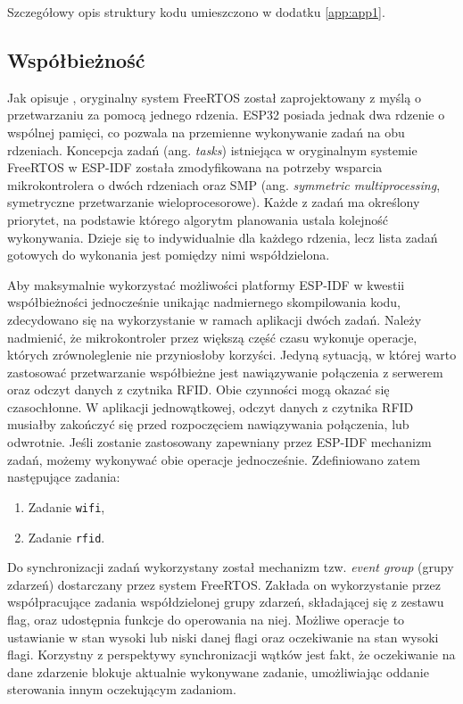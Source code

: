             Szczegółowy opis struktury kodu umieszczono w dodatku \ref{app:app1}.

        \subsection{Współbieżność}
        \label{sub:tasks}

            Jak opisuje \cite{esp-idf-freertos-smp-changes}, oryginalny system FreeRTOS został zaprojektowany z myślą o przetwarzaniu za pomocą jednego rdzenia. ESP32 posiada jednak dwa rdzenie o wspólnej pamięci, co pozwala na przemienne wykonywanie zadań na obu rdzeniach. Koncepcja zadań (ang. \textit{tasks}) istniejąca w oryginalnym systemie FreeRTOS w ESP-IDF została zmodyfikowana na potrzeby wsparcia mikrokontrolera o dwóch rdzeniach oraz SMP (ang. \textit{symmetric multiprocessing}, symetryczne przetwarzanie wieloprocesorowe). Każde z zadań ma określony priorytet, na podstawie którego algorytm planowania ustala kolejność wykonywania. Dzieje się to indywidualnie dla każdego rdzenia, lecz lista zadań gotowych do wykonania jest pomiędzy nimi współdzielona.

            Aby maksymalnie wykorzystać możliwości platformy ESP-IDF w kwestii współbieżności jednocześnie unikając nadmiernego skompilowania kodu, zdecydowano się na wykorzystanie w ramach aplikacji dwóch zadań. Należy nadmienić, że mikrokontroler przez większą część czasu wykonuje operacje, których zrównoleglenie nie przyniosłoby korzyści. Jedyną sytuacją, w której warto zastosować przetwarzanie współbieżne jest nawiązywanie połączenia z serwerem oraz odczyt danych z czytnika RFID. Obie czynności mogą okazać się czasochłonne. W aplikacji jednowątkowej, odczyt danych z czytnika RFID musiałby zakończyć się przed rozpoczęciem nawiązywania połączenia, lub odwrotnie. Jeśli zostanie zastosowany zapewniany przez ESP-IDF mechanizm zadań, możemy wykonywać obie operacje jednocześnie. Zdefiniowano zatem następujące zadania:

            \begin{enumerate}
                \item Zadanie \texttt{wifi},
                \item Zadanie \texttt{rfid}.
            \end{enumerate}

            Do synchronizacji zadań wykorzystany został mechanizm tzw. \textit{event group} (grupy zdarzeń) dostarczany przez system FreeRTOS. Zakłada on wykorzystanie przez współpracujące zadania współdzielonej grupy zdarzeń, składającej się z zestawu flag, oraz udostępnia funkcje do operowania na niej. Możliwe operacje to ustawianie w stan wysoki lub niski danej flagi oraz oczekiwanie na stan wysoki flagi. Korzystny z perspektywy synchronizacji wątków jest fakt, że oczekiwanie na dane zdarzenie blokuje aktualnie wykonywane zadanie, umożliwiając oddanie sterowania innym oczekującym zadaniom.

